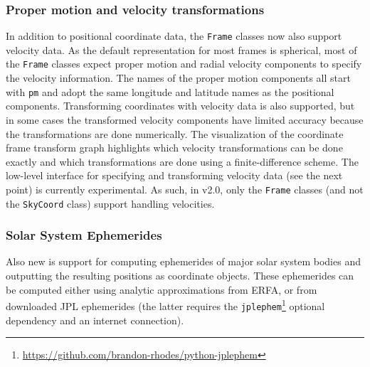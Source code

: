 \documentclass[modern]{aastex61}
\newcommand{\package}[1]{\texttt{#1}\xspace}
\newcommand{\inlinecomment}[2]{\todo[inline]{#1: #2}\xspace}
\begin{document}
\subsubsection{Proper motion and velocity transformations}
    In addition to positional coordinate data, the \texttt{Frame} classes now
    also support velocity data.
    As the default representation for most frames is spherical, most of the
    \texttt{Frame} classes expect proper motion and radial velocity components
    to specify the velocity information.
    The names of the proper motion components all start with \texttt{pm} and
    adopt the same longitude and latitude names as the positional components.
    Transforming coordinates with velocity data is also supported, but in some
    cases the transformed velocity components have limited accuracy because the
    transformations are done numerically.
    The visualization of the coordinate frame transform graph highlights which
    velocity transformations can be done exactly and which transformations are
    done using a finite-difference scheme.
    The low-level interface for specifying and transforming velocity data (see
    the next point) is currently experimental.
    As such, in v2.0, only the \texttt{Frame} classes (and not the
    \texttt{SkyCoord} class) support handling velocities.




\subsubsection{Solar System Ephemerides}
    Also new is support for computing ephemerides of major solar system bodies
    and outputting the resulting positions as coordinate objects.
    These ephemerides can be computed either using analytic approximations from
    ERFA, or from downloaded JPL ephemerides (the latter requires the
    \package{jplephem}\footnote{\url{https://github.com/brandon-rhodes/python-jplephem}}
    optional dependency and an internet connection).
\end{document}

